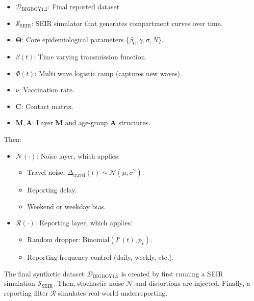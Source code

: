 \documentclass[11pt,a4paper]{article}
\theoremstyle{remark}\newtheorem{remark}{Remark}
\begin{document}
\begin{itemize}
    \item $\mathcal{D}_{\text{BIGBOY1.2}}$: Final reported dataset
    \item $\mathcal{S}_{\text{SEIR}}$:  SEIR simulator that generates compartment curves over time.
    \item $\boldsymbol{\Theta}$: Core epidemiological parameters  $\{\beta_0, \gamma, \sigma, N\}$.
    \item $\beta(t)$: Time varying transmission function.
    \item $\Phi(t)$: Multi wave logistic ramp (captures new waves).
    \item $\nu$: Vaccination rate.
    \item $\mathbf{C}$: Contact matrix.
    \item $\mathbf{M}, \mathbf{A}$: Layer $\mathbf{M}$ and age-group $\mathbf{A}$ structures.
\end{itemize}

Then:
\begin{itemize}
    \item $\mathcal{N}(\cdot)$: Noise layer, which applies:
    \begin{itemize}
        \item Travel noise: $\Delta_{\text{travel}}(t) \sim \mathcal{N}(\mu, \sigma^2)$.
        \item Reporting delay.
        \item Weekend or weekday bias.
    \end{itemize}
    \item $\mathcal{R}(\cdot)$: Reporting layer, which applies:
    \begin{itemize}
        \item Random dropper: $\text{Binomial}(I'(t), p_r)$.
        \item Reporting frequency control (daily, weekly, etc.).
    \end{itemize}
\end{itemize}
The final synthetic dataset $\mathcal{D}_{\text{BIGBOY1.2}}$ is created by first running a SEIR simulation $\mathcal{S}_{\text{SEIR}}$. Then, stochastic noise $\mathcal{N}$ and distortions are injected. Finally, a reporting filter $\mathcal{R}$ simulates real-world underreporting.
\end{document}
